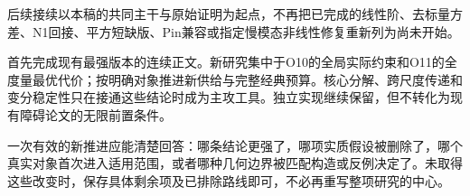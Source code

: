 \documentclass[UTF8,fontset=fandol,zihao=-4,a4paper]{ctexart}
\theoremstyle{remark}
\begin{document}
后续接续以本稿的共同主干与原始证明为起点，不再把已完成的线性阶、去标量方差、N1回接、平方短缺版、Pin兼容或指定慢模态非线性修复重新列为尚未开始。

首先完成现有最强版本的连续正文。新研究集中于O10的全局实际约束和O11的全度量最优代价；按明确对象推进新供给与完整经典预算。核心分解、跨尺度传递和变分稳定性只在接通这些结论时成为主攻工具。独立实现继续保留，但不转化为现有障碍论文的无限前置条件。

一次有效的新推进应能清楚回答：哪条结论更强了，哪项实质假设被删除了，哪个真实对象首次进入适用范围，或者哪种几何边界被匹配构造或反例决定了。未取得这些改变时，保存具体剩余项及已排除路线即可，不必再重写整项研究的中心。
\end{document}
